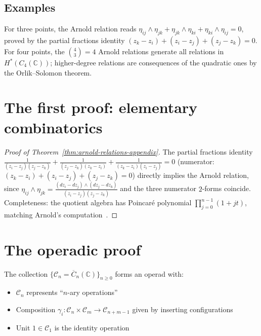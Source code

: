 \subsection{Examples}

For three points, the Arnold relation reads
$\eta_{ij} \wedge \eta_{jk} + \eta_{jk} \wedge \eta_{ki} + \eta_{ki} \wedge \eta_{ij} = 0$,
proved by the partial fractions identity $(z_k - z_i) + (z_i - z_j) + (z_j - z_k) = 0$.
For four points, the $\binom{4}{3} = 4$ Arnold relations generate all relations in $H^*(C_4(\mathbb{C}))$; higher-degree relations are consequences of the quadratic ones by the Orlik--Solomon theorem.

\section{The first proof: elementary combinatorics}\label{sec:first-complete-proof}

\begin{proof}[Proof of Theorem~\ref{thm:arnold-relations-appendix}]
The partial fractions identity
$\frac{1}{(z_i - z_j)(z_j - z_k)} + \frac{1}{(z_j - z_k)(z_k - z_i)} + \frac{1}{(z_k - z_i)(z_i - z_j)} = 0$
(numerator: $(z_k - z_i) + (z_i - z_j) + (z_j - z_k) = 0$) directly implies the Arnold relation, since
$\eta_{ij} \wedge \eta_{jk} = \frac{(dz_i - dz_j) \wedge (dz_j - dz_k)}{(z_i - z_j)(z_j - z_k)}$
and the three numerator $2$-forms coincide.  Completeness: the quotient algebra has Poincar\'{e} polynomial $\prod_{j=0}^{n-1}(1+jt)$, matching Arnold's computation~\cite{Arnold69}.
\end{proof}

\section{The operadic proof}

\begin{definition}
The collection $\{\mathcal{C}_n = \overline{C}_n(\mathbb{C})\}_{n \geq 0}$ forms an operad with:
\begin{itemize}
\item $\mathcal{C}_n$ represents ``$n$-ary operations''
\item Composition $\gamma_i: \mathcal{C}_n \times \mathcal{C}_m \to \mathcal{C}_{n+m-1}$ given by inserting configurations
\item Unit $1 \in \mathcal{C}_1$ is the identity operation
\end{itemize}
\end{definition}

